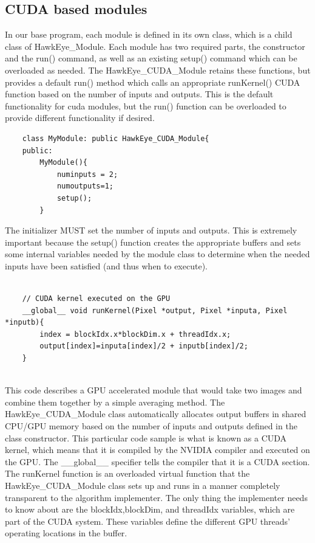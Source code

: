 \documentclass[letterpaper,10pt,titlepage]{IEEEtran}
\begin{document}
   \subsection{CUDA based modules}
In our base program, each module is defined in its own class, which is a child class of HawkEye\_Module. Each module has two required parts, the constructor and the run() command, as well as an existing setup() command which can be overloaded as needed. The HawkEye\_CUDA\_Module retains these functions, but provides a default run() method which calls an appropriate runKernel() CUDA function based on the number of inputs and outputs. This is the default functionality for cuda modules, but the run() function can be overloaded to provide different functionality if desired. \\
   \begin{lstlisting}
   	class MyModule: public HawkEye_CUDA_Module{
	public:
		MyModule(){
			numinputs = 2;
			numoutputs=1;
			setup();
		}  
   \end{lstlisting}
 \par
   The initializer MUST set the number of inputs and outputs. This is extremely important because the setup() function creates the appropriate buffers and sets some internal variables needed by the module class to determine when the needed inputs have been satisfied (and thus when to execute).\\
   \begin{lstlisting}
	   
	// CUDA kernel executed on the GPU
   	__global__ void runKernel(Pixel *output, Pixel *inputa, Pixel *inputb){
	    index = blockIdx.x*blockDim.x + threadIdx.x;
		output[index]=inputa[index]/2 + inputb[index]/2;
	}
	
   \end{lstlisting}
 \par
   This code describes a GPU accelerated module that would take two images and combine them together by a simple averaging method. The HawkEye\_CUDA\_Module class automatically allocates output buffers in shared CPU/GPU memory based on the number of inputs and outputs defined in the class constructor. This particular code sample is what is known as a CUDA kernel, which means that it is compiled by the NVIDIA compiler and executed on the GPU. The \_\_global\_\_ specifier tells the compiler that it is a CUDA section. The runKernel function is an overloaded virtual function that the HawkEye\_CUDA\_Module class sets up and runs in a manner completely transparent to the algorithm implementer. The only thing the implementer needs to know about are the blockIdx,blockDim, and threadIdx variables, which are part of the CUDA system. These variables define the different GPU threads' operating locations in the buffer.\\
\end{document}
